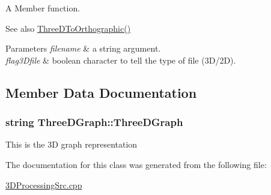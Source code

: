A Member function. 

\begin{DoxySeeAlso}{See also}
\hyperlink{classThreeDGraph_a7f484956c7d616b6724e758ed43e5bed}{Three\+D\+To\+Orthographic()} 
\end{DoxySeeAlso}

\begin{DoxyParams}{Parameters}
{\em filename} & a string argument. \\
\hline
{\em flag3\+Dfile} & boolean character to tell the type of file (3\+D/2D). \\
\hline
\end{DoxyParams}


\subsection{Member Data Documentation}
\subsubsection[{\texorpdfstring{Three\+D\+Graph}{ThreeDGraph}}]{\setlength{\rightskip}{0pt plus 5cm}string Three\+D\+Graph\+::\+Three\+D\+Graph}\hypertarget{classThreeDGraph_ab2553252d92e1a3e81e58b81ef95220a}{}\label{classThreeDGraph_ab2553252d92e1a3e81e58b81ef95220a}
This is the 3D graph representation 

The documentation for this class was generated from the following file\+:\begin{DoxyCompactItemize}
\item 
\hyperlink{3DProcessingSrc_8cpp}{3\+D\+Processing\+Src.\+cpp}\end{DoxyCompactItemize}
